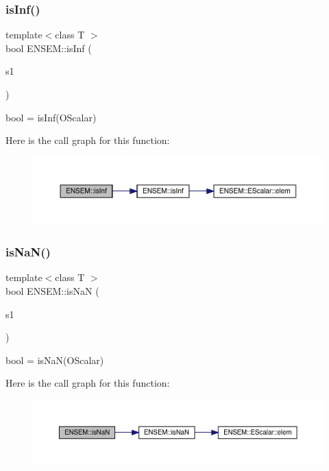 \subsubsection{\texorpdfstring{isInf()}{isInf()}}
{\footnotesize\ttfamily template$<$class T $>$ \\
bool E\+N\+S\+E\+M\+::is\+Inf (\begin{DoxyParamCaption}\item[{const \mbox{\hyperlink{classENSEM_1_1OScalar}{O\+Scalar}}$<$ T $>$ \&}]{s1 }\end{DoxyParamCaption})}



bool = is\+Inf(\+O\+Scalar) 

Here is the call graph for this function\+:\nopagebreak
\begin{figure}[H]
\begin{center}
\leavevmode
\includegraphics[width=350pt]{d1/d71/group__obsscalar_ga53c459a4a8b7d6d7df49c71d8c998c48_cgraph}
\end{center}
\end{figure}
\mbox{\label{group__obsscalar_ga265314c3773d12257146fec9dd1c2524}} 
\subsubsection{\texorpdfstring{isNaN()}{isNaN()}}
{\footnotesize\ttfamily template$<$class T $>$ \\
bool E\+N\+S\+E\+M\+::is\+NaN (\begin{DoxyParamCaption}\item[{const \mbox{\hyperlink{classENSEM_1_1OScalar}{O\+Scalar}}$<$ T $>$ \&}]{s1 }\end{DoxyParamCaption})}



bool = is\+Na\+N(\+O\+Scalar) 

Here is the call graph for this function\+:\nopagebreak
\begin{figure}[H]
\begin{center}
\leavevmode
\includegraphics[width=350pt]{d1/d71/group__obsscalar_ga265314c3773d12257146fec9dd1c2524_cgraph}
\end{center}
\end{figure}
\mbox{\label{group__obsscalar_gacdda3d4e73f6b414d6c2d99e3f69af85}} 
